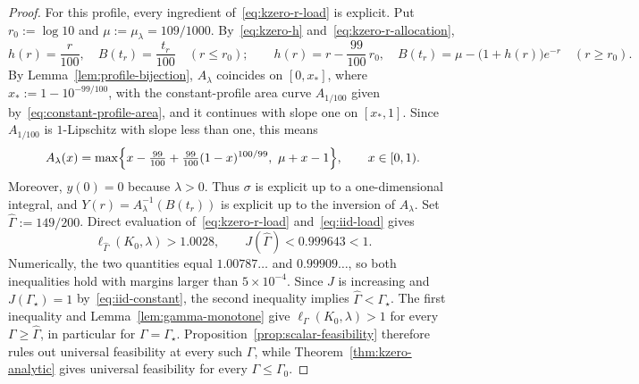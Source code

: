 \documentclass[11pt]{article}
\theoremstyle{definition}
\theoremstyle{remark}
\begin{document}
\begin{proof}
For this profile, every ingredient of~\eqref{eq:kzero-r-load} is explicit.
Put $r_0:=\log10$ and $\mu:=\mu_\lambda=109/1000$.
By~\eqref{eq:kzero-h} and~\eqref{eq:kzero-r-allocation},
\[
 h(r)=\frac{r}{100},\quad B(t_r)=\frac{t_r}{100}\quad(r\le r_0);
 \qquad
 h(r)=r-\frac{99}{100}\,r_0,\quad B(t_r)=\mu-\bigl(1+h(r)\bigr)e^{-r}\quad(r\ge r_0).
\]
By Lemma~\ref{lem:profile-bijection}, $A_\lambda$ coincides on $[0,x_*]$, where $x_*:=1-10^{-99/100}$, with the constant-profile area curve $A_{1/100}$ given by~\eqref{eq:constant-profile-area}, and it continues with slope one on $[x_*,1]$.
Since $A_{1/100}$ is $1$-Lipschitz with slope less than one, this means
\[
 A_\lambda(x)=\max\Bigl\{x-\tfrac{99}{100}+\tfrac{99}{100}(1-x)^{100/99},\ \mu+x-1\Bigr\},
 \qquad x\in[0,1).
\]
Moreover, $y(0)=0$ because $\lambda>0$.
Thus $\sigma$ is explicit up to a one-dimensional integral, and $Y(r)=A_\lambda^{-1}(B(t_r))$ is explicit up to the inversion of $A_\lambda$.
Set $\widehat\Gamma:=149/200$.
Direct evaluation of~\eqref{eq:kzero-r-load} and~\eqref{eq:iid-load} gives
\begin{equation}\label{eq:k0-explicit-certificate}
 \ell_{\widehat\Gamma}(K_0,\lambda)>1.0028,
 \qquad
 J(\widehat\Gamma)<0.999643<1.
\end{equation}
Numerically, the two quantities equal $1.00787\ldots$ and $0.99909\ldots$, so both inequalities hold with margins larger than $5\times10^{-4}$.
Since $J$ is increasing and $J(\Gamma_\star)=1$ by~\eqref{eq:iid-constant},
the second inequality implies $\widehat\Gamma<\Gamma_\star$.
The first inequality and Lemma~\ref{lem:gamma-monotone} give
$\ell_\Gamma(K_0,\lambda)>1$ for every $\Gamma\ge\widehat\Gamma$,
in particular for $\Gamma=\Gamma_\star$.
Proposition~\ref{prop:scalar-feasibility} therefore rules out universal
feasibility at every such $\Gamma$, while
Theorem~\ref{thm:kzero-analytic} gives universal feasibility for
every $\Gamma\le\Gamma_0$.
\end{proof}
\end{document}
